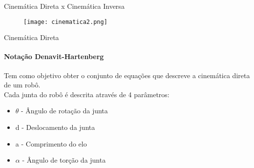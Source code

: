 \begin{frame}[c]{Cinemática Direta x Cinemática Inversa} 

    \begin{figure}
        \texttt{[image: cinematica2.png]}
    \end{figure}
        
\end{frame}
\begin{frame}[c]{Cinemática Direta} 
    \framesubtitle{Notação Denavit-Hartenberg}
    Tem como objetivo obter o conjunto de equações que descreve a cinemática direta de um robô. \\
    Cada junta do robô é descrita através de 4 parâmetros:
    \begin{itemize}
        \item $\theta$ - Ângulo de rotação da junta
        \item d - Deslocamento da junta
        \item a - Comprimento do elo
        \item $\alpha$ - Ângulo de torção da junta
        
    \end{itemize}

\end{frame}
